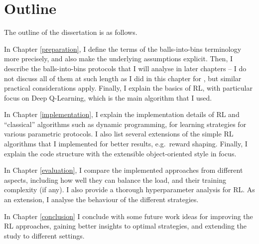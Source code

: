 

\section{Outline}

The outline of the dissertation is as follows.


In Chapter \ref{preparation}, I define the terms of the balls-into-bins terminology more precisely, and also make the underlying assumptions explicit. Then, I describe the balls-into-bins protocols that I will analyse in later chapters -- I do not discuss all of them at such length as I did in this chapter for \TwoThinning, but similar practical considerations apply. Finally, I explain the basics of RL, with particular focus on Deep Q-Learning, which is the main algorithm that I used.


In Chapter \ref{implementation}, I explain the implementation details of RL and ``classical'' algorithms such as dynamic programming, for learning strategies for various parametric protocols. I also list several extensions of the simple RL algorithms that I implemented for better results, e.g.\ reward shaping. Finally, I explain the code structure with the extensible object-oriented style in focus.


In Chapter \ref{evaluation}, I compare the implemented approaches from different aspects, including how well they can balance the load, and their training complexity (if any). I also provide a thorough hyperparameter analysis for RL. As an extension, I analyse the behaviour of the different strategies. 


In Chapter \ref{conclusion} I conclude with some future work ideas for improving the RL approaches, gaining better insights to optimal strategies, and extending the study to different settings.